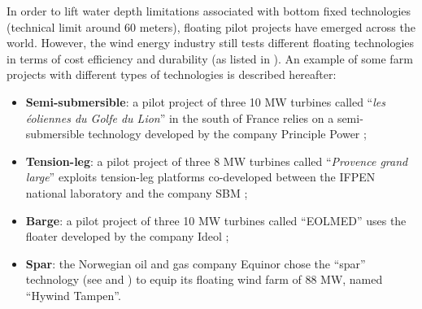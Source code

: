 In order to lift water depth limitations associated with bottom fixed technologies (technical limit around 60 meters), floating pilot projects have emerged across the world. 
However, the wind energy industry still tests different floating technologies in terms of cost efficiency and durability (as listed in \citealp{mackinnon_2022_FOWT_table}). 
An example of some farm projects with different types of technologies is described hereafter: 
\begin{itemize}
    \item \textbf{Semi-submersible}: a pilot project of three 10 MW turbines called ``\textit{les \'{e}oliennes du Golfe du Lion}'' in the south of France relies on a semi-submersible technology developed by the company Principle Power \citep{cermelli_2018_windfloat};   
    \item \textbf{Tension-leg}: a pilot project of three 8 MW turbines called ``\textit{Provence grand large}'' exploits tension-leg platforms co-developed between the IFPEN national laboratory and the company SBM \citep{caille_2017_TPL_IFPEN}; 
    \item \textbf{Barge}: a pilot project of three 10 MW turbines called ``EOLMED'' uses the floater developed by the company Ideol \citep{guignier_2016_ideol}; 
    \item \textbf{Spar}: the Norwegian oil and gas company Equinor chose the ``spar'' technology (see  and \citealp{driscoll_2016_hywind}) to equip its floating wind farm of 88 MW, named ``Hywind Tampen''. 
\end{itemize}

